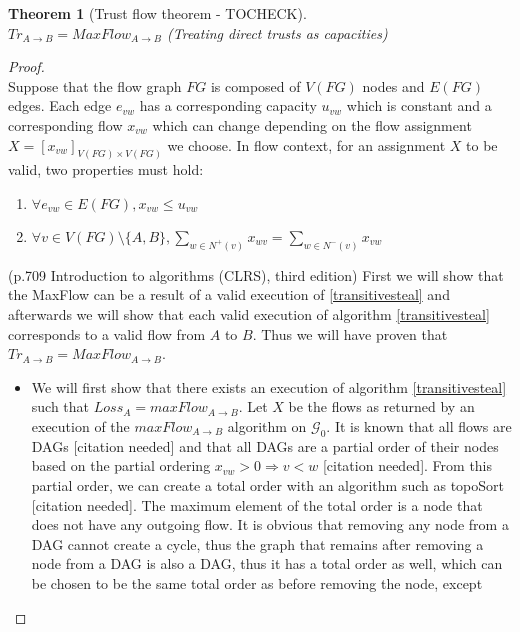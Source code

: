 \documentclass[11pt]{article}
\newtheorem{theorem}{Theorem}[section]
\theoremstyle{definition}
\theoremstyle{corollary}
\theoremstyle{lemma}
\begin{document}
    \begin{theorem}[Trust flow theorem - TOCHECK] \ \\
    \label{trustflow}
       $Tr_{A \rightarrow B} = MaxFlow_{A \rightarrow B}$ (Treating direct trusts as capacities)
    \end{theorem}
    \begin{proof} \ \\
       Suppose that the flow graph $FG$ is composed of $V(FG)$ nodes and $E(FG)$ edges. Each edge $e_{vw}$ has a
       corresponding capacity $u_{vw}$ which is constant and a corresponding flow $x_{vw}$ which can change depending on the
       flow assignment $X = [x_{vw}]_{V(FG) \times V(FG)}$ we choose. In flow context, for an assignment $X$ to be valid, two
       properties must hold:
       \begin{enumerate}
          \item $\forall e_{vw} \in E(FG), x_{vw} \leq u_{vw}$
          \item $\forall v \in V(FG) \setminus \{A,B\}, \sum\limits_{w \in N^{+}(v)}x_{wv} =
                \sum\limits_{w \in N^{-}(v)}x_{vw}$
       \end{enumerate} (p.709 Introduction to algorithms (CLRS), third edition)
       First we will show that the MaxFlow can be a result of a valid execution of \ref{transitivesteal} and afterwards we
       will show that each valid execution of algorithm \ref{transitivesteal} corresponds to a valid flow from $A$ to $B$.
       Thus we will have proven that $Tr_{A \rightarrow B} = MaxFlow_{A \rightarrow B}$.
       \begin{itemize}
          \item We will first show that there exists an execution of algorithm \ref{transitivesteal} such that $Loss_A =
          maxFlow_{A \rightarrow B}$. Let $X$ be the flows as returned by an execution of the $maxFlow_{A \rightarrow B}$
          algorithm on $\mathcal{G}_0$. It is known that all flows are DAGs [citation needed] and that all DAGs are a partial
          order of their nodes based on the partial ordering $x_{vw} > 0 \Rightarrow v < w$ [citation needed]. From this
          partial order, we can create a total order with an algorithm such as topoSort [citation needed]. The maximum
          element of the total order is a node that does not have any outgoing flow. It is obvious that removing any node
          from a DAG cannot create a cycle, thus the graph that remains after removing a node from a DAG is also a DAG, thus
          it has a total order as well, which can be chosen to be the same total order as before removing the node, except

\end{itemize}
\end{proof}
\end{document}
